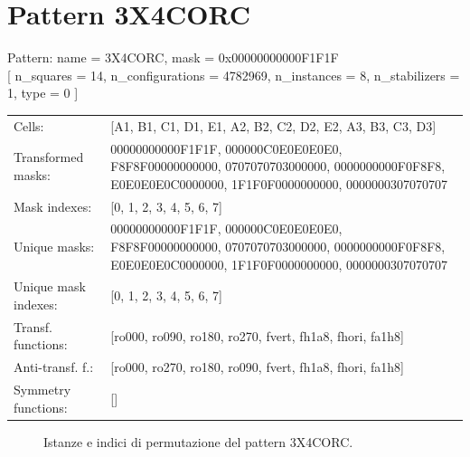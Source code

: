 \newpage

\section{Pattern 3X4CORC}

\begin{tcolorbox}[sharp corners, fontupper=\ttfamily\small, colback=white]
  \noindent Pattern: name = 3X4CORC, mask = 0x00000000000F1F1F\\
  {[} n\_squares = 14, n\_configurations = 4782969,
  n\_instances = 8, n\_stabilizers = 1, type = 0 { ]}\\[1.0ex]
  \begin{tabularx}{\textwidth}{@{} p{3.5cm} X @{}}
    Cells:               & {[}A1, B1, C1, D1, E1, A2, B2, C2, D2, E2, A3, B3, C3, D3{]}\\[0.5ex]
    Transformed masks:   & 00000000000F1F1F, 000000C0E0E0E0E0, F8F8F00000000000, 0707070703000000, 0000000000F0F8F8, E0E0E0E0C0000000, 1F1F0F0000000000, 0000000307070707\\[0.5ex]
    Mask indexes:        & {[}0, 1, 2, 3, 4, 5, 6, 7{]}\\[0.5ex]
    Unique masks:        & 00000000000F1F1F, 000000C0E0E0E0E0, F8F8F00000000000, 0707070703000000, 0000000000F0F8F8, E0E0E0E0C0000000, 1F1F0F0000000000, 0000000307070707\\[0.5ex]
    Unique mask indexes: & {[}0, 1, 2, 3, 4, 5, 6, 7{]}\\[0.5ex]
    Transf. functions:   & {[}ro000, ro090, ro180, ro270, fvert, fh1a8, fhori, fa1h8{]}\\[0.5ex]
    Anti-transf. f.:     & {[}ro000, ro270, ro180, ro090, fvert, fh1a8, fhori, fa1h8{]}\\[0.5ex]
    Symmetry functions:  & {[}{]}\\[0.5ex]
  \end{tabularx}
\end{tcolorbox}

\begin{figure}[htbp]
  \centering
   \hfill
   \hfill
   \hfill
  \vspace{0.3cm}
   \hfill
   \hfill
   \hfill
  \caption{Istanze e indici di permutazione del pattern 3X4CORC.}
\end{figure}

\newpage
